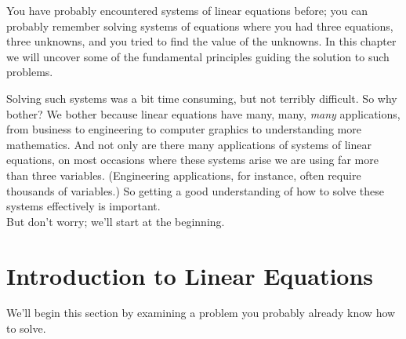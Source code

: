 You have probably encountered systems of linear equations before; you can probably remember solving systems of equations where you had three equations, three unknowns, and you tried to find the value of the unknowns. In this chapter we will uncover some of the fundamental principles guiding the solution to such problems.

Solving such systems was a bit time consuming, but not terribly difficult. So why bother? We bother because linear equations have many, many, \textit{many} applications, from business to engineering to computer graphics to understanding more mathematics. And not only are there many applications of systems of linear equations, on most occasions where these systems arise we are using far more than three variables. (Engineering applications, for instance, often require thousands of variables.) So getting a good understanding of how to solve these systems effectively is important.\\

But don't worry; we'll start at the beginning.

\section{Introduction to Linear Equations}\label{sec:intro}


We'll begin this section by examining a problem you probably already know how to solve.

\medskip

